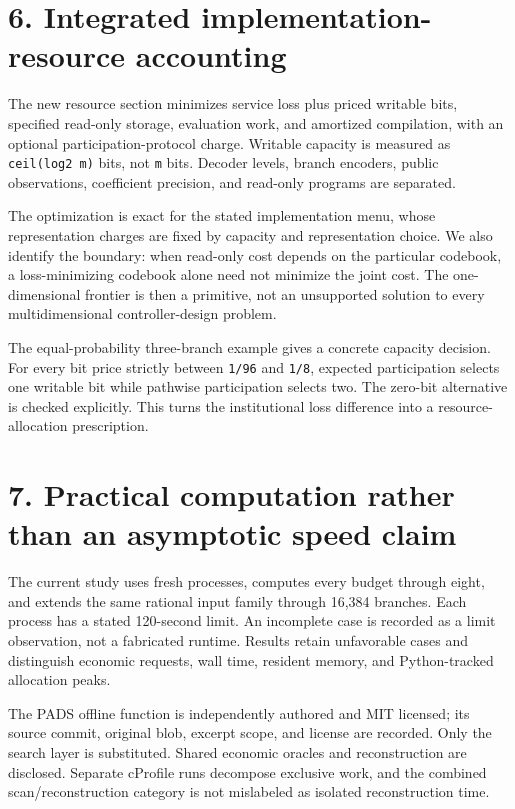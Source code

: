 \documentclass[11pt,letterpaper]{article}
\theoremstyle{definition}\newtheorem{assumption}[theorem]{Assumption}
\begin{document}
\section*{6. Integrated implementation-resource accounting}

The new resource section minimizes service loss plus priced writable bits, specified read-only storage, evaluation work, and amortized compilation, with an optional participation-protocol charge. Writable capacity is measured as \texttt{ceil(log2 m)} bits, not \texttt{m} bits. Decoder levels, branch encoders, public observations, coefficient precision, and read-only programs are separated.

The optimization is exact for the stated implementation menu, whose representation charges are fixed by capacity and representation choice. We also identify the boundary: when read-only cost depends on the particular codebook, a loss-minimizing codebook alone need not minimize the joint cost. The one-dimensional frontier is then a primitive, not an unsupported solution to every multidimensional controller-design problem.

The equal-probability three-branch example gives a concrete capacity decision. For every bit price strictly between \texttt{1/\allowbreak{}96} and \texttt{1/\allowbreak{}8}, expected participation selects one writable bit while pathwise participation selects two. The zero-bit alternative is checked explicitly. This turns the institutional loss difference into a resource-allocation prescription.

\section*{7. Practical computation rather than an asymptotic speed claim}

The current study uses fresh processes, computes every budget through eight, and extends the same rational input family through 16,384 branches. Each process has a stated 120-second limit. An incomplete case is recorded as a limit observation, not a fabricated runtime. Results retain unfavorable cases and distinguish economic requests, wall time, resident memory, and Python-tracked allocation peaks.

The PADS offline function is independently authored and MIT licensed; its source commit, original blob, excerpt scope, and license are recorded. Only the search layer is substituted. Shared economic oracles and reconstruction are disclosed. Separate cProfile runs decompose exclusive work, and the combined scan/reconstruction category is not mislabeled as isolated reconstruction time.
\end{document}
